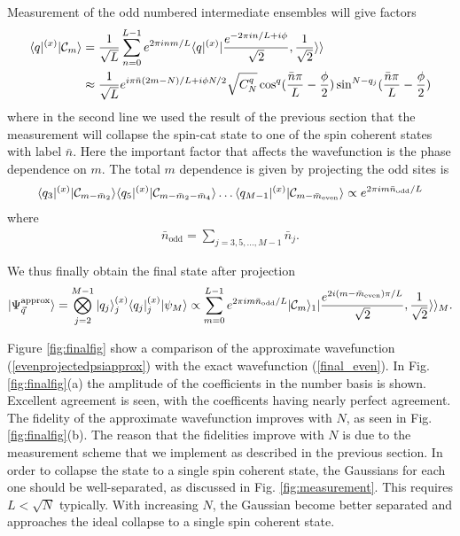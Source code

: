 \documentclass{WileyMSP-template}
\begin{document}
Measurement of the odd numbered intermediate ensembles will give factors
%
\begin{align}
\langle q|^{(x)} | {\cal C}_m \rangle & = \frac{1}{\sqrt{L}} \sum_{n=0}^{L-1} e^{2 \pi i nm/L }
\langle q|^{(x)}  | \frac{ e^{-2 \pi i n/L + i \phi}}{\sqrt{2}}, \frac{ 1}{\sqrt{2}} \rangle \rangle \nonumber \\
& \approx \frac{1}{\sqrt{L}} e^{i \pi \bar{n} (2m - N)/L + i \phi N/2 } \sqrt{C_N^{q}}  \cos^{q} ( \frac{\bar{n} \pi}{L} - \frac{\phi}{2} )\sin^{N-q_j} ( \frac{\bar{n} \pi}{L} - \frac{\phi}{2} )
\end{align}
%
where in the second line we used the result of the previous section that the measurement will collapse the spin-cat state to one of the spin coherent states with label $ \bar{n} $.  Here the important factor that affects the wavefunction is the phase dependence on $ m $.  The total $ m $ dependence is given by projecting the odd sites is
%
\begin{align}
\langle q_3|^{(x)} | {\cal C}_{m -\bar{m}_2} \rangle
\langle q_5|^{(x)} | {\cal C}_{m -\bar{m}_2 - \bar{m}_4 } \rangle \dots
\langle q_{M-1} |^{(x)} | {\cal C}_{m - \bar{m}_\text{even} } \rangle
\propto e^{2 \pi i m \bar{n}_{\text{odd}}/L }
\end{align}
%
where
%
\begin{align}
\bar{n}_{\text{odd}} = \sum_{j=3,5,\dots, M-1} \bar{n}_j  .
\end{align}

We thus finally obtain the final state after projection
%
\begin{align}
| \Psi_{\vec{q}}^{\text{approx}} \rangle =  \bigotimes_{j=2}^{M-1}  |q_j \rangle_j^{(x)} \langle q_j |_j^{(x)}  |\psi_M \rangle \propto  \sum_{m=0}^{L-1} e^{2 \pi i m \bar{n}_{\text{odd}}/L } | {\cal C}_{m}  \rangle_1 |\frac{e^{2 i (m - \bar{m}_{\text{even}})  \pi/L }}{\sqrt{2}},\frac{1}{\sqrt{2}}\rangle\rangle_{M} .
 \label{evenprojectedpsiapprox}
\end{align}


Figure \ref{fig:finalfig} show a comparison of the approximate wavefunction (\ref{evenprojectedpsiapprox}) with the exact wavefunction (\ref{final_even}).  In Fig. \ref{fig:finalfig}(a) the amplitude of the coefficients in the number basis is shown.  Excellent agreement is seen, with the coefficents having nearly perfect agreement.  The fidelity of the approximate wavefunction improves with $ N $, as seen in Fig. \ref{fig:finalfig}(b).  The reason that the fidelities improve with $ N $ is due to the measurement scheme that we implement as described in the previous section.  In order to collapse the state to a single spin coherent state, the Gaussians for each one should be well-separated, as discussed in Fig. \ref{fig:measurement}.  This requires $ L < \sqrt{N} $ typically. With increasing $ N $, the Gaussian become better separated and approaches the ideal collapse to a single spin coherent state.
\end{document}
